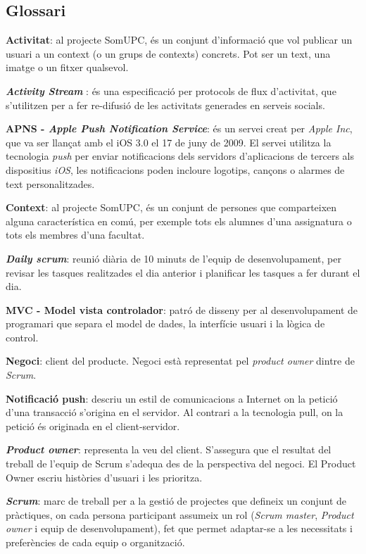 
\subsection{Glossari}


\textbf{Activitat}: al projecte SomUPC, és un conjunt d'informació que vol publicar un usuari a un context (o un grups de contexts) concrets. Pot ser un text, una imatge o un fitxer qualsevol.

\textbf{\textit{Activity Stream}} \cite{activityStream}: és una especificació per protocols de flux d'activitat, que s'utilitzen per a fer re-difusió de les activitats generades en serveis socials.

\textbf{APNS - \textit{Apple Push Notification Service}}: és un servei creat per \textit{Apple Inc}, que va ser llançat amb el iOS 3.0 el 17 de juny de 2009. El servei utilitza la tecnologia \textit{push} per enviar notificacions dels servidors d'aplicacions de tercers als dispositius \textit{iOS}, les notificacions poden incloure logotips, cançons o alarmes de text personalitzades.

\textbf{Context}: al projecte SomUPC, és un conjunt de persones que comparteixen alguna característica en comú, per exemple tots els alumnes d'una assignatura o tots els membres d'una facultat.

\textbf{\textit{Daily scrum}}: reunió diària de 10 minuts de l'equip de desenvolupament, per revisar les tasques realitzades el dia anterior i planificar les tasques a fer durant el dia.

\textbf{MVC - Model vista controlador}: patró de disseny per al desenvolupament de programari que separa el model de dades, la interfície usuari i la lògica de control.

\textbf{Negoci}: client del producte. Negoci està representat pel \textit{product owner} dintre de \textit{Scrum}.

\textbf{Notificació push}: descriu un estil de comunicacions a Internet on la petició d'una transacció s'origina en el servidor. Al contrari a la tecnologia pull, on la petició és originada en el client-servidor.

\textbf{\textit{Product owner}}: representa la veu del client. S'assegura que el resultat del treball de l'equip de Scrum s'adequa des de la perspectiva del negoci. El Product Owner escriu històries d'usuari i les prioritza.

\textbf{\textit{Scrum}}: marc de treball per a la gestió de projectes que defineix un conjunt de pràctiques, on cada persona participant assumeix un rol (\textit{Scrum master}, \textit{Product owner} i equip de desenvolupament), fet que permet adaptar-se a les necessitats i preferències de cada equip o organització.

